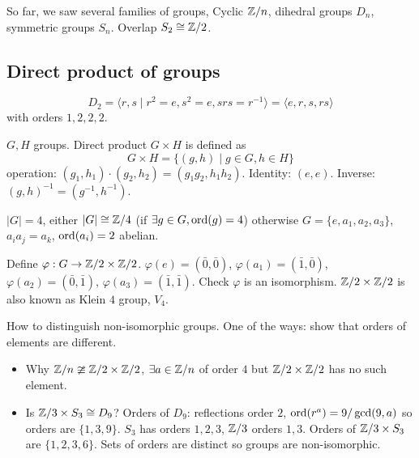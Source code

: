\documentclass[10pt, a4paper]{article}
\begin{document}
So far,
we saw several families of groups,
Cyclic $\mathbb{Z} / n$,
dihedral groups $D_n$,
symmetric groups $S_n$.
Overlap $S_2 \cong \mathbb{Z} / 2$.

\subsection{Direct product of groups}
\[
D_2 = \langle r, s \mid r ^ 2 = e, s ^ 2 = e, srs = r ^ {-1}\rangle = \langle e, r, s, rs\rangle
\]
with orders $1, 2, 2, 2$.

\begin{definition}
    $G, H$ groups.
    Direct product $G \times H$ is defined as
    \[
    G \times H = \{(g, h) \mid g \in G, h \in H\}
    \]
    operation:
    $(g_1, h_1) \cdot (g_2, h_2) = (g_1g_2, h_1h_2)$.
    Identity:
    $(e, e)$.
    Inverse:
    $(g, h) ^ {-1} = (g ^ {-1}, h ^ {-1})$.
\end{definition}

\begin{example}
    $|G| = 4$,
    either $|G| \cong \mathbb{Z} / 4$
    (if $\exists g \in G, \operatorname{ord}(g) = 4$)
    otherwise $G = \{e, a_1, a_2, a_3\}$,
    $a_ia_j = a_k$,
    $\operatorname{ord}(a_i) = 2$ abelian.

    Define $\varphi : G \to \mathbb{Z} / 2 \times \mathbb{Z} / 2$.
    $\varphi(e) = (\bar{0}, \bar{0})$,
    $\varphi(a_1) = (\bar{1}, \bar{0})$,
    $\varphi(a_2) = (\bar{0}, \bar{1})$,
    $\varphi(a_3) = (\bar{1}, \bar{1})$.
    Check $\varphi$ is an isomorphism.
    $\mathbb{Z} / 2 \times \mathbb{Z} / 2$ is also known as Klein $4$ group,
    $V_4$.
\end{example}

How to distinguish non-isomorphic groups.
One of the ways:
show that orders of elements are different.
\begin{example}
    \begin{itemize}
        \item Why $\mathbb{Z} / n \ncong \mathbb{Z} / 2 \times \mathbb{Z} / 2$,
        $\exists a \in \mathbb{Z} / n$ of order $4$ but $\mathbb{Z} / 2 \times \mathbb{Z} / 2$ has no such element.

        \item Is $\mathbb{Z} / 3 \times S_3 \cong D_9$?
        Orders of $D_9$:
        reflections order $2$,
        $\operatorname{ord}(r ^ a) = 9 / \gcd(9, a)$ so orders are $\{1, 3, 9\}$.
        $S_3$ has orders $1, 2, 3$,
        $\mathbb{Z} / 3$ orders $1, 3$.
        Orders of $\mathbb{Z} / 3 \times S_3$ are $\{1, 2, 3, 6\}$.
        Sets of orders are distinct so groups are non-isomorphic.
    \end{itemize}
\end{example}
\end{document}
